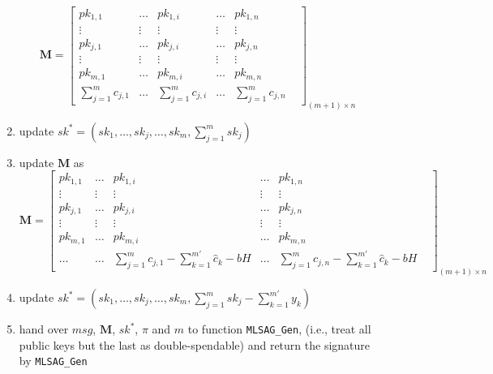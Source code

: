 \begin{description}
\begin{enumerate}
					\[
						\mathbf{M}=\begin{bmatrix}
							pk_{1,1} &\dots &pk_{1,i} &\dots &pk_{1,n} \\
							 \vdots &\vdots &\vdots &\vdots &\vdots &\\
							pk_{j,1} &\dots &pk_{j,i} &\dots &pk_{j,n} \\
							 \vdots &\vdots &\vdots &\vdots &\vdots &\\
							pk_{m,1} &\dots &pk_{m,i} &\dots &pk_{m,n} \\
							\sum_{j=1}^{m}c_{j,1} &\dots &\sum_{j=1}^{m}c_{j,i} &\dots &\sum_{j=1}^{m}c_{j,n}
						\end{bmatrix}_{(m+1)\times n}
					\]
				\item update \(sk^*=(sk_1,\dots,sk_j,\dots,sk_m,\sum_{j=1}^m sk_j)\)
				\item update \(\mathbf{M}\) as  
					\[
						\mathbf{M}=\begin{bmatrix}
							pk_{1,1} &\dots &pk_{1,i} &\dots &pk_{1,n} \\
							 \vdots &\vdots &\vdots &\vdots &\vdots &\\
							pk_{j,1} &\dots &pk_{j,i} &\dots &pk_{j,n} \\
							 \vdots &\vdots &\vdots &\vdots &\vdots &\\
							pk_{m,1} &\dots &pk_{m,i} &\dots &pk_{m,n} \\
							\dots &\dots &\sum_{j=1}^{m}c_{j,1}-\sum_{k=1}^{m'}\hat{c}_k-bH  &\dots &\sum_{j=1}^{m}c_{j,n}-\sum_{k=1}^{m'}\hat{c}_k-bH 
						\end{bmatrix}_{(m+1)\times n}
					\]
				\item update \(sk^*=(sk_1,\dots,sk_j,\dots,sk_m,\sum_{j=1}^m sk_j-\sum_{k=1}^{m'}y_k)\)
				\item hand over \(msg\), \(\mathbf{M}\), \(sk^*\), \(\pi\) and \(m\) to function \texttt{MLSAG\_Gen}, (i.e., treat all public keys but the last as double-spendable) and return the signature by \texttt{MLSAG\_Gen}
			\end{enumerate}
	\end{description}
